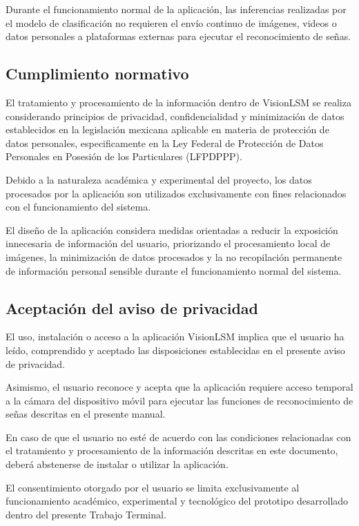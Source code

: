 	Durante el funcionamiento normal de la aplicación, las inferencias realizadas por el modelo de clasificación no requieren el envío continuo de imágenes, videos o datos personales a plataformas externas para ejecutar el reconocimiento de señas.
	
	
	\subsection{Cumplimiento normativo}
	
	El tratamiento y procesamiento de la información dentro de VisionLSM se realiza considerando principios de privacidad, confidencialidad y minimización de datos establecidos en la legislación mexicana aplicable en materia de protección de datos personales, especificamente en la Ley Federal de Protección de Datos Personales en Posesión de los Particulares (LFPDPPP).
	
	Debido a la naturaleza académica y experimental del proyecto, los datos procesados por la aplicación son utilizados exclusivamente con fines relacionados con el funcionamiento del sistema.
	
	El diseño de la aplicación considera medidas orientadas a reducir la exposición innecesaria de información del usuario, priorizando el procesamiento local de imágenes, la minimización de datos procesados y la no recopilación permanente de información personal sensible durante el funcionamiento normal del sistema.

		
	\subsection{Aceptación del aviso de privacidad}
	
	El uso, instalación o acceso a la aplicación VisionLSM implica que el usuario ha leído, comprendido y aceptado las disposiciones establecidas en el presente aviso de privacidad.
	
	Asimismo, el usuario reconoce y acepta que la aplicación requiere acceso temporal a la cámara del dispositivo móvil para ejecutar las funciones de reconocimiento de señas descritas en el presente manual.
	
	En caso de que el usuario no esté de acuerdo con las condiciones relacionadas con el tratamiento y procesamiento de la información descritas en este documento, deberá abstenerse de instalar o utilizar la aplicación.
	
	El consentimiento otorgado por el usuario se limita exclusivamente al funcionamiento académico, experimental y tecnológico del prototipo desarrollado dentro del presente Trabajo Terminal.
	
	
	
